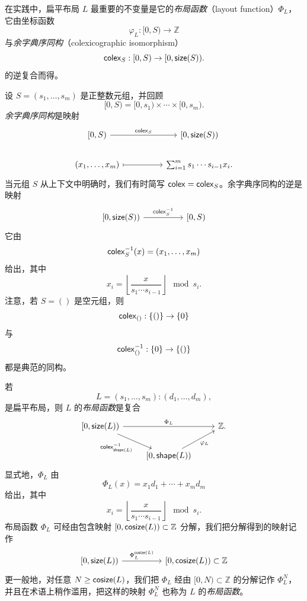 在实践中，扁平布局 $L$ 最重要的不变量是它的{\it 布局函数}（layout function）$\Phi_L$，它由坐标函数
\[
\varphi_L:[0,S) \to \mathbb{Z}
\]
与{\it 余字典序同构}（colexicographic isomorphism）
\[
\mathsf{colex}_S:[0,S) \to [0,\mathsf{size}(S)).
\]
的逆复合而得。

\begin{definition}\label{definitionofcolex}
    设 $S = (s_1,\dots,s_m)$ 是正整数元组，并回顾
    \[
    [0,S) = [0,s_1) \times \cdots \times [0,s_m).
    \]
    {\it 余字典序同构}是映射
    \[ \begin{tikzcd}
    {[}0,S{)} \ar[rr,"\colex_{S}"] & & \text{[}0,\size(S)\text{)}\\
    (x_1,\dots,x_m) \ar[rr,mapsto] & & \sum_{i=1}^m s_1 \cdots s_{i-1} x_i.
    \end{tikzcd} \]
    当元组 $S$ 从上下文中明确时，我们有时简写 $\mathsf{colex} = \mathsf{colex}_{S}$。余字典序同构的逆是映射
    \[ \begin{tikzcd}
    \text{[}0,\size(S)\text{)} \ar[rr,"\colex_{S}^{-1}"] & & {[}0,S{)}
    \end{tikzcd} \]
    它由
    \[
    \mathsf{colex}_S^{-1}(x) = (x_1,\dots,x_m)
    \]
    给出，其中
    \[
    x_i = \left\lfloor \dfrac{x}{s_1 \cdots s_{i-1}} \right\rfloor \mod s_i.
    \]
    注意，若 $S = ()$ 是空元组，则
    \[
    \mathsf{colex}_{()}:\{()\} \to \{0\}
    \]
    与
    \[
    \mathsf{colex}_{()}^{-1}:\{0\} \to \{()\}
    \]
    都是典范的同构。
\end{definition}



\begin{construction}[布局函数]\label{constructionoflayoutfunctions}
    若
    \[L = (s_1,\dots,s_m):(d_1,\dots,d_m),\]
    是扁平布局，则 $L$ 的{\it 布局函数}是复合
    \[ \begin{tikzcd}
    {[}0,\size(L){)} \ar[rr,"\Phi_L"] \ar[dr,swap,"\colex^{-1}_{\shape(L)}"] & & \mathbb{Z}. \\
     & {[}0,\shape(L){)} \ar[ur,swap,"\varphi_L"] &
    \end{tikzcd} \]
    显式地，$\Phi_L$ 由
    \[
    \Phi_L(x) = x_1 d_1 + \cdots + x_m d_m
    \]
    给出，其中
    \[
    x_i = \left \lfloor \dfrac{x}{s_1 \cdots s_{i-1}} \right \rfloor \mod s_i.
    \]
    布局函数 $\Phi_L$ 可经由包含映射 $[0,\mathsf{cosize}(L)) \subset \mathbb{Z}$ 分解，我们把分解得到的映射记作
    \[\begin{tikzcd} {[}0,\size(L){)} \ar[rr,"\Phi_L^{\cosize(L)}"] & & {[}0,\cosize(L){)}\subset \mathbb{Z}
    \end{tikzcd} \]
    更一般地，对任意 $N \geq \mathsf{cosize}(L)$，我们把 $\Phi_L$ 经由 $[0,N) \subset \mathbb{Z}$ 的分解记作 $\Phi_L^N$，并且在术语上稍作滥用，把这样的映射 $\Phi_L^N$ 也称为 $L$ 的{\it 布局函数}。
\end{construction}

